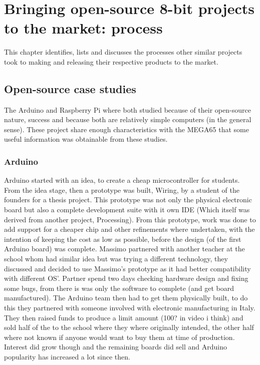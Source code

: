 
\chapter{Bringing open-source 8-bit projects to the market: process}
\label{Chapter4}

This chapter identifies, lists and discusses the processes other similar projects took to making and releasing their respective products to the market.
\section{Open-source case studies}
The Arduino and Raspberry Pi where both studied because of their open-source nature, success and because both are relatively simple computers (in the general sense). These project share enough characteristics with the MEGA65 that some useful information was obtainable from these studies.

\subsection{Arduino}
Arduino started with an idea, to create a cheap microcontroller for students. From the idea stage, then a prototype was built, Wiring, by a student of the founders for a thesis project. This prototype was not only the physical electronic board but also a complete development suite with it own IDE (Which itself was derived from another project, Processing). From this prototype, work was done to add support for a cheaper chip and other refinements where undertaken, with the intention of keeping the cost as low as possible, before the design (of the first Arduino board) was complete. Massimo partnered with another teacher at the school whom had similar idea but was trying a different technology, they discussed and decided to use Massimo's prototype as it had better compatibility with different OS'. Partner spend two days checking hardware design and fixing some bugs, from there is was only the software to complete (and get board manufactured). The Arduino team then had to get them physically built, to do this they partnered with someone involved with electronic manufacturing in Italy. They then raised funds to produce a limit amount (100? in video i think) and sold half of the to the school where they where originally intended, the other half where not known if anyone would want to buy them at time of production. Interest did grow though and the remaining boards did sell and Arduino popularity has increased a lot since then. 

